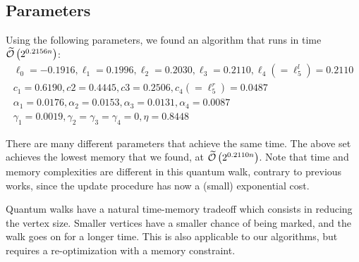 \subsection{Parameters}\label{subsection:new-quantum-bcj}
Using the following parameters, we found an algorithm that runs in time $\widetilde{\mathcal{O}} \left(2^{0.2156n} \right)$:
\begin{gather*}
\ell_0 = -0.1916, \ell_1 = 0.1996, \ell_2 = 0.2030, \ell_3 = 0.2110, \ell_4 (=\ell_5^l) = 0.2110 \\
c_1 = 0.6190, c2 = 0.4445, c3 =0.2506, c_4 (=\ell_5^r) = 0.0487 \\
\alpha_1 = 0.0176, \alpha_2 = 0.0153, \alpha_3 = 0.0131, \alpha_4 = 0.0087 \\
\gamma_1 = 0.0019, \gamma_2 = \gamma_3 = \gamma_4 = 0, \eta = 0.8448
\end{gather*}


There are many different parameters that achieve the same time. The above set achieves the lowest memory that we found, at $\widetilde{\mathcal{O}} \left(2^{0.2110n} \right)$. Note that time and memory complexities are different in this quantum walk, contrary to previous works, since the update procedure has now a (small) exponential cost.

\begin{remark}
Quantum walks have a natural time-memory tradeoff which consists in reducing the vertex size. Smaller vertices have a smaller chance of being marked, and the walk goes on for a longer time. This is also applicable to our algorithms, but requires a re-optimization with a memory constraint.
\end{remark}


